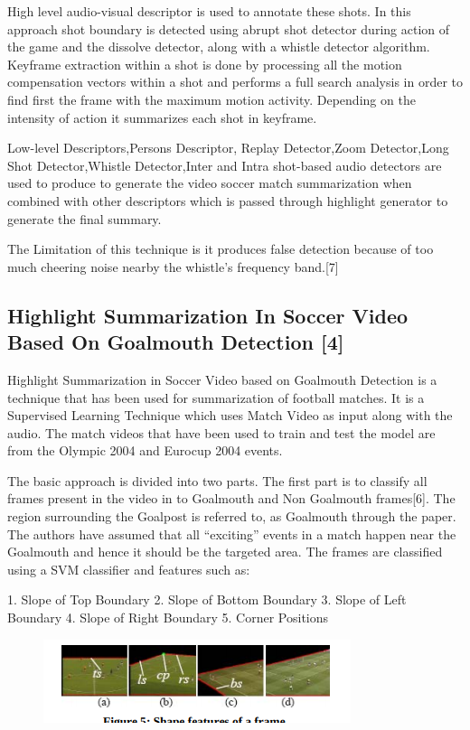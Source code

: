 \documentclass[twocolumn,showpacs,%
  nofootinbib,aps,superscriptaddress,%
  eqsecnum,prd,notitlepage,showkeys,10pt]{revtex4-1}
\begin{document}
High level audio-visual descriptor is used to annotate these shots. In this approach shot boundary is detected using abrupt shot detector during action of the game and the dissolve detector, along with a whistle detector algorithm. Keyframe extraction within a shot is done by processing all the motion compensation vectors within a shot and performs a full search analysis in order to find first the frame with the maximum motion activity. Depending on the intensity of action it summarizes each shot in keyframe.

Low-level Descriptors,Persons Descriptor, Replay Detector,Zoom Detector,Long Shot Detector,Whistle Detector,Inter and Intra shot-based audio detectors are used to produce to generate the video soccer match summarization when combined with other descriptors which is passed through highlight generator to generate the final summary.

The Limitation of this technique is it produces false detection because of too much cheering noise nearby the whistle’s frequency band.[7]

\subsection{Highlight Summarization In Soccer Video Based On Goalmouth Detection [4]}

	 	 	
Highlight Summarization in Soccer Video based on Goalmouth Detection is a technique that has been used for summarization of football matches. It is a Supervised Learning Technique which uses Match Video as input along with the audio. The match videos that have been used to train and test the model are from the Olympic 2004 and Eurocup 2004 events.

The basic approach is divided into two parts. The first part is to classify all frames present in the video in to Goalmouth and Non Goalmouth frames[6]. The region surrounding the Goalpost is referred to, as Goalmouth through the paper. The authors have assumed that all “exciting” events in a match happen near the Goalmouth and hence it should be the targeted area.
The frames are classified using a SVM classifier and features such as:

1. Slope of Top Boundary	
2. Slope of Bottom Boundary
3. Slope of Left Boundary
4. Slope of Right Boundary
5. Corner Positions

\begin{figure}[h]
\includegraphics[width=\linewidth]{img3.png}
\end{figure}
\end{document}
